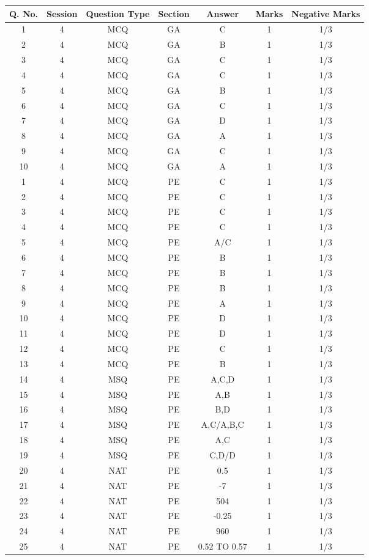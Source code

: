 \begin{tabular}[12pt]{|c|c|c|c|c|c|c|}
\hline
Q. No.&Session&Question Type&Section&Answer&Marks&Negative Marks\\
\hline
1&4&MCQ&GA&C&1&1/3\\
\hline
2&4&MCQ&GA&B&1&1/3\\
\hline
3&4&MCQ&GA&C&1&1/3\\
\hline
4&4&MCQ&GA&C&1&1/3\\
\hline
5&4&MCQ&GA&B&1&1/3\\
\hline
6&4&MCQ&GA&C&1&1/3\\
\hline
7&4&MCQ&GA&D&1&1/3\\
\hline
8&4&MCQ&GA&A&1&1/3\\
\hline
9&4&MCQ&GA&C&1&1/3\\
\hline
10&4&MCQ&GA&A&1&1/3\\
\hline
1&4&MCQ&PE&C&1&1/3\\
\hline
2&4&MCQ&PE&C&1&1/3\\
\hline
3&4&MCQ&PE&C&1&1/3\\
\hline
4&4&MCQ&PE&C&1&1/3\\
\hline
5&4&MCQ&PE&A/C&1&1/3\\
\hline
6&4&MCQ&PE&B&1&1/3\\
\hline
7&4&MCQ&PE&B&1&1/3\\
\hline
8&4&MCQ&PE&B&1&1/3\\
\hline
9&4&MCQ&PE&A&1&1/3\\
\hline
10&4&MCQ&PE&D&1&1/3\\
\hline
11&4&MCQ&PE&D&1&1/3\\
\hline
12&4&MCQ&PE&C&1&1/3\\
\hline
13&4&MCQ&PE&B&1&1/3\\
\hline
14&4&MSQ&PE&A,C,D&1&1/3\\
\hline
15&4&MSQ&PE&A,B&1&1/3\\
\hline
16&4&MSQ&PE&B,D&1&1/3\\
\hline
17&4&MSQ&PE&A,C/A,B,C&1&1/3\\
\hline
18&4&MSQ&PE&A,C&1&1/3\\
\hline
19&4&MSQ&PE&C,D/D&1&1/3\\
\hline
20&4&NAT&PE&0.5&1&1/3\\
\hline
21&4&NAT&PE&-7&1&1/3\\
\hline
22&4&NAT&PE&504&1&1/3\\
\hline
23&4&NAT&PE&-0.25&1&1/3\\
\hline
24&4&NAT&PE&960&1&1/3\\
\hline
25&4&NAT&PE&0.52 TO 0.57&1&1/3\\

\end{tabular}

